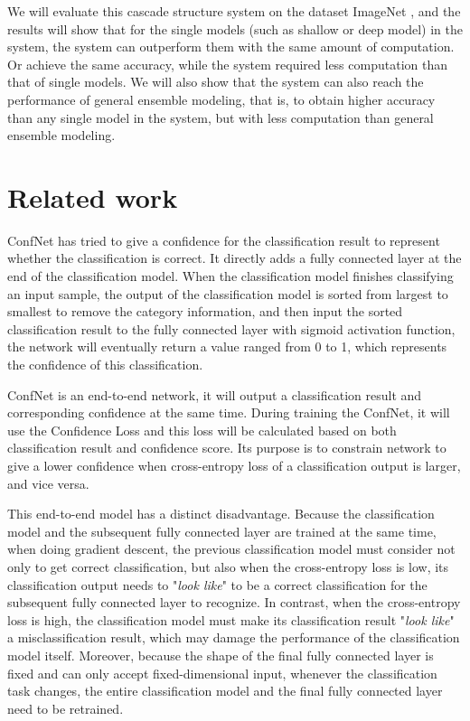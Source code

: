 \documentclass{article}
\begin{document}
We will evaluate this cascade structure system on the dataset ImageNet \cite{deng2009imagenet}, and the results will show that for the single models (such as shallow or deep model) in the system, the system can outperform them with the same amount of computation. Or achieve the same accuracy, while the system required less computation than that of single models. We will also show that the system can also reach the performance of general ensemble modeling, that is, to obtain higher accuracy than any single model in the system, but with less computation than general ensemble modeling.


\section{Related work}
\label{Related_work}
ConfNet \cite{wan2018confnet} has tried to give a confidence for the classification result to represent whether the classification is correct. It directly adds a fully connected layer at the end of the classification model. When the classification model finishes classifying an input sample, the output of the classification model is sorted from largest to smallest to remove the category information, and then input the sorted classification result to the fully connected layer with sigmoid activation function, the network will eventually return a value ranged from 0 to 1, which represents the confidence of this classification.


ConfNet is an end-to-end network, it will output a classification result and corresponding confidence at the same time. During training the ConfNet, it will use the Confidence Loss \cite{wan2018confnet} and this loss will be calculated based on both classification result and confidence score. Its purpose is to constrain network to give a lower confidence when cross-entropy loss of a classification output is larger, and vice versa.


This end-to-end model has a distinct disadvantage. Because the classification model and the subsequent fully connected layer are trained at the same time, when doing gradient descent, the previous classification model must consider not only to get correct classification, but also when the cross-entropy loss is low, its classification output needs to "\emph{look like}" to be a correct classification for the subsequent fully connected layer to recognize. In contrast, when the cross-entropy loss is high, the classification model must make its classification result "\emph{look like}" a misclassification result, which may damage the performance of the classification model itself. Moreover, because the shape of the final fully connected layer is fixed and can only accept fixed-dimensional input, whenever the classification task changes, the entire classification model and the final fully connected layer need to be retrained.
\end{document}
